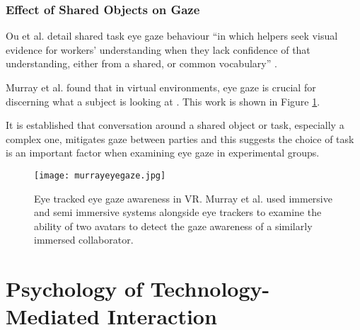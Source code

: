 \subsubsection{Effect of Shared Objects on Gaze}
Ou et al. detail shared task eye gaze behaviour ``in which helpers seek visual evidence for workers' understanding when they lack confidence of that understanding, either from a shared, or common vocabulary'' \cite{Ou2005}.\par 
  Murray et al. found that in virtual environments, eye gaze is crucial for discerning what a subject is looking at \cite{Murray2009}. This work is shown in Figure \ref{fig:murrayeyegaze}.\par
It is established that conversation around a shared object or task, especially a complex one, mitigates gaze between parties \cite{Argyle1976} and this suggests the choice of task is an important factor when examining eye gaze in experimental groups. \par
\begin{figure}[!h]
\texttt{[image: murrayeyegaze.jpg]}
\caption{Eye tracked eye gaze awareness in VR. Murray et al. used immersive and semi immersive systems alongside eye trackers to examine the ability of two avatars to detect the gaze awareness of a similarly immersed collaborator.}
\label{fig:murrayeyegaze}
\end{figure}                                       
\section{Psychology of Technology-Mediated Interaction}       
